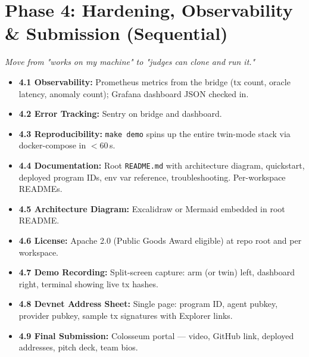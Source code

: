 \documentclass[11pt, a4paper]{article}
\begin{document}
\section{Phase 4: Hardening, Observability \& Submission (Sequential)}
\textit{Move from "works on my machine" to "judges can clone and run it."}
\begin{itemize}
    \item \textbf{4.1 Observability:} Prometheus metrics from the bridge (tx count, oracle latency, anomaly count); Grafana dashboard JSON checked in.
    \item \textbf{4.2 Error Tracking:} Sentry on bridge and dashboard.
    \item \textbf{4.3 Reproducibility:} \texttt{make demo} spins up the entire twin-mode stack via docker-compose in $<$60\,s.
    \item \textbf{4.4 Documentation:} Root \texttt{README.md} with architecture diagram, quickstart, deployed program IDs, env var reference, troubleshooting. Per-workspace READMEs.
    \item \textbf{4.5 Architecture Diagram:} Excalidraw or Mermaid embedded in root README.
    \item \textbf{4.6 License:} Apache 2.0 (Public Goods Award eligible) at repo root and per workspace.
    \item \textbf{4.7 Demo Recording:} Split-screen capture: arm (or twin) left, dashboard right, terminal showing live tx hashes.
    \item \textbf{4.8 Devnet Address Sheet:} Single page: program ID, agent pubkey, provider pubkey, sample tx signatures with Explorer links.
    \item \textbf{4.9 Final Submission:} Colosseum portal --- video, GitHub link, deployed addresses, pitch deck, team bios.
\end{itemize}
\end{document}
